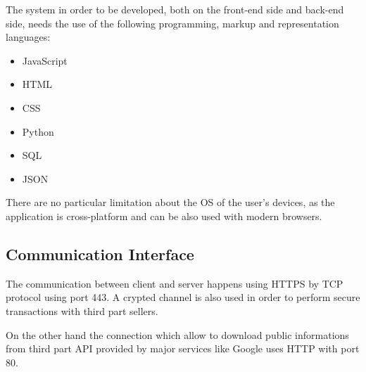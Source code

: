 \documentclass[numbers=noenddot, 12pt, a4paper, oneside]{scrbook}
\begin{document}
The system in order to be developed, both on the front-end side and back-end side, needs the use of the following programming, markup and representation languages:
\begin{itemize}
	\item JavaScript
	\item HTML
	\item CSS
	\item Python
	\item SQL
	\item JSON
\end{itemize}
There are no particular limitation about the OS of the user's devices, as the application is cross-platform and can be also used with modern browsers.

\subsection*{Communication Interface}

The communication between client and server happens using HTTPS by TCP protocol using port 443. A crypted channel is also used in order to perform secure transactions with third part sellers.

On the other hand the connection which allow to download public informations from third part API provided by major services like Google uses HTTP with port 80.
\end{document}
